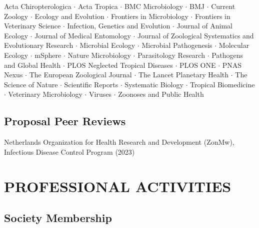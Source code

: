 \documentclass{cv}
\begin{document}
Acta Chiropterologica $\cdot$ Acta Tropica $\cdot$ BMC Microbiology $\cdot$ BMJ $\cdot$ Current Zoology $\cdot$ Ecology and Evolution $\cdot$ Frontiers in Microbiology $\cdot$ Frontiers in Veterinary Science $\cdot$ Infection, Genetics and Evolution $\cdot$ Journal of Animal Ecology $\cdot$ Journal of Medical Entomology $\cdot$ Journal of Zoological Systematics and Evolutionary Research $\cdot$ Microbial Ecology $\cdot$ Microbial Pathogenesis $\cdot$ Molecular Ecology $\cdot$ mSphere $\cdot$ Nature Microbiology $\cdot$ Parasitology Research $\cdot$ Pathogens and Global Health $\cdot$ PLOS Neglected Tropical Diseases $\cdot$ PLOS ONE $\cdot$ PNAS Nexus $\cdot$ The European Zoological Journal $\cdot$ The Lancet Planetary Health $\cdot$ The Science of Nature $\cdot$ Scientific Reports $\cdot$ Systematic Biology $\cdot$ Tropical Biomedicine $\cdot$ Veterinary Microbiology $\cdot$ Viruses $\cdot$ Zoonoses and Public Health

\subsection*{Proposal Peer Reviews}

Netherlands Organization for Health Research and Development (ZonMw), Infectious Disease Control Program (2023)





\section*{PROFESSIONAL ACTIVITIES}

\subsection*{Society Membership}
\end{document}
